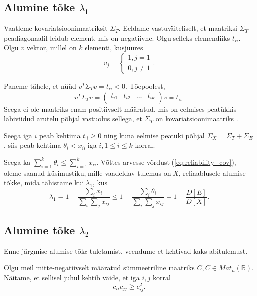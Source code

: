 \documentclass[a4paper,12pt]{article}
\numberwithin{equation}{section}
\theoremstyle{definition}
\begin{document}
\subsection{Alumine tõke $\lambda_1$}

Vaatleme kovariatsioonimaatriksit $\Sigma_T$. Eeldame vastuväiteliselt, et maatriksi $\Sigma_T$ peadiagonaalil leidub element, mis on negatiivne. Olgu selleks elemendiiks  $t_{ii}$. Olgu $v$ vektor, millel on $k$ elementi, kusjuures 
\begin{equation*}
v_j =
\begin{cases}
1, j = 1 \\
0, j \neq 1
\end{cases} 
\text{.}
\end{equation*} 

Paneme tähele, et n\"u\"ud $v^T \Sigma_T v = t_{ii} < 0$. Tõepoolest,
\begin{equation*}
v^T \Sigma_T v = 
\begin{pmatrix}
t_{i1} & t_{i2} &  \hdots & t_{ik}\\
\end{pmatrix} v = t_{ii} \text{.}
\end{equation*} Seega ei ole maatriks enam positiivselt määratud, mis on eelmises peatükkis läbiviidud arutelu põhjal vastuolus sellega, et $\Sigma_T$ on kovariatsioonimaatriks .

Seega iga $i$ peab kehtima $t_{ii} \geq 0$ ning kuna eelmise peatüki põhjal $\Sigma_X = \Sigma_T + \Sigma_E$, siis peab kehtima $\theta_i < x_{ii}$ iga $i, 1 \leq i \leq k$ korral.

Seega ka $\sum \limits_{i=1}^k \theta_i \leq \sum \limits_{i=1}^k x_{ii}$. Võttes arvesse võrdust (\ref{eq:reliability_cov}), oleme saanud küsimustiku, mille vaadeldav tulemus on $X$,  reliaablusele alumise tõkke, mida tähistame kui $\lambda_1$, kus
\begin{equation}
\lambda_1 = 1 - \frac{\sum_i x_i}{\sum_i \sum_j x_{ij}} \leq  1 - \frac{\sum_i \theta_i}{\sum_i \sum_j x_{ij}} =  1 - \frac{D \left[ E \right]}{D \left[ X \right]}.
\end{equation} 

\subsection{Alumine tõke $\lambda_2$}

Enne järgmise alumise tõke tuletamist, veendume et kehtivad kaks abitulemust.

Olgu meil mitte-negatiivselt määratud s\"ummeetriline maatriks $C, C \in Mat_{n}(\mathbb{R})$. Näitame, et sellisel juhul kehtib väide, et iga $i,j$ korral
\begin{equation*}
c_{ii}c_{jj} \geq c_{ij}^2 \text{.}
\end{equation*}
\end{document}
